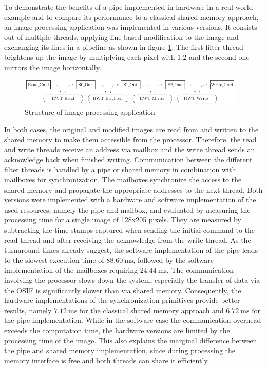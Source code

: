 To demonstrate the benefits of a pipe implemented in hardware in a real world
example and to compare its performance to a classical shared memory approach,
an image processing application was implemented in various versions. It
consists out of multiple threads, applying line based modification to the
image and exchanging its lines in a pipeline as shown in figure
\ref{fig:img_proc}.
The first filter thread brightens up the image by multiplying each pixel with
$1.2$ and the second one mirrors the image horizontally.
\begin{figure}
	\centering
	\includegraphics[width=0.97\textwidth]{../figures/img_proc}
	\caption{Structure of image processing application}
	\label{fig:img_proc}
\end{figure}
In both cases, the
original and modified images are read from and written to the shared memory to
make them accessible from the processor. Therefore, the read and write threads
receive an address via mailbox and the write thread sends an acknowledge back
when finished writing. Communication between the different filter threads is
handled by a pipe or shared memory in combination with mailboxes for
synchronization. The mailboxes synchronize the access to the shared memory and
propagate the appropriate addresses to the next thread. Both versions were
implemented with a hardware and software implementation of the used resources,
namely the pipe and mailbox, and evaluated by measuring the processing time
for a single image of 128x205 pixels. They are measured by subtracting the
time stamps captured when sending the initial command to the read thread and
after receiving the acknowledge from the write thread. As the turnaround times
already suggest, the software implementation of the pipe leads to the slowest
execution time of $\SI{88.60}{\milli\second}$, followed by the software
implementation of the mailboxes requiring $\SI{24.44}{\milli\second}$. The
communication involving the processor slows down the system, especially the
transfer of data via the \ac{OSIF} is significantly slower than via shared
memory. Consequently, the hardware implementations of the synchronization
primitives provide better results, namely $\SI{7.12}{\milli\second}$ for the
classical shared memory approach and $\SI{6.72}{\milli\second}$ for the pipe
implementation. While in the software case the communication overhead exceeds
the computation time, the hardware versions are limited by the processing time
of the image. This also explains the marginal difference between the pipe and
shared memory implementation, since during processing the memory interface is
free and both threads can share it efficiently.